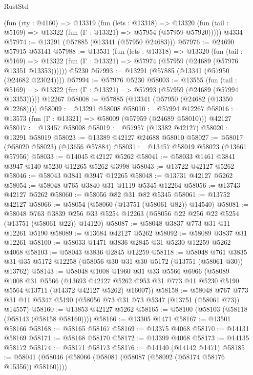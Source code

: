 \begin{lexlean}{RustStd}
\begin{coremodule}
    (fun (rty : @4160) =>
    @13319
      (fun (lets : @13318) =>
      @13320 (fun (tail : @5169) => @13322 (fun (Γ : @13321) => @57954 (@57959 @57920)))))
    @4334
@57974 := @13291 (@57885 (@13341 (@57950 @24683)))
@57976 := @24690 @57915 @53141
@57988 := @13531
    (fun (lets : @13318) =>
    @13320
      (fun (tail : @5169) =>
      @13322 (fun (Γ : @13321) => @57974 (@57959 (@24689 (@57976 @13351 @13353))))))
    @5230
@57993 := @13291 (@57885 (@13341 (@57950 (@24682 @23024))))
@57994 := @57976 @5230
@58003 := @13555
    (fun (tail : @5169) => @13322 (fun (Γ : @13321) => @57993 (@57959 (@24689 (@57994 @13353)))))
    @12267
@58008 := @57885 (@13341 (@57950 (@24682 (@13350 @12268))))
@58009 := @13291 @58008
@58010 := @57994 @12267
@58016 := @13573 (fun (Γ : @13321) => @58009 (@57959 (@24689 @58010))) @42127
@58017 := @13457 @58008
@58019 := @57957 (@13382 @42127)
@58020 := @13291 @58019
@58023 := @13389 @42127 @24688 @58010
@58027 := @58017 (@58020 @58023) (@13656 @57884)
@58031 := @13457 @58019 @58023 (@13661 @57956)
@58033 := @14045 @42127 @5262
@58041 := @58033 @1461 @3841 @3947 @140 @5230 @12265 @5262 @3998
@58043 := @13722 @42127 @5262
@58046 := @58043 @3841 @3947 @12265
@58048 := @13731 @42127 @5262
@58054 := @58048 @765 @3840 @31 @1119 @5345 @12264
@58056 := @13743 @42127 @5262
@58060 := @58056 @82 @31 @82 @5345
@58061 := @13752 @42127
@58066 := @58054 (@58060 (@13751 (@58061 @82)) @14540)
@58081 := @58048
    @763
    @3839
    @256
    @33
    @5254
    @12263
    (@58056 @22 @256 @22 @5254 (@13751 (@58061 @22)) @14120)
@58087 := @58048 @3837 @773 @31 @11 @12261 @5190
@58089 := @13684 @42127 @5262
@58092 := @58089 @3837 @31 @12261
@58100 := @58033 @1471 @3836 @2845 @31 @5230 @12259 @5262 @4068
@58103 := @58043 @3836 @2845 @12259
@58118 := @58048
    @761
    @3835
    @31
    @35
    @5172
    @12258
    (@58056 @30 @31 @30 @5172 (@13751 (@58061 @30)) @13762)
@58143 := @58048
    @1008
    @1960
    @31
    @33
    @5566
    @6966
    (@58089
      @1008
      @31
      @5566
      (@13693 @42127 @5262 @953 @31 @773 @11 @5230 @5190 @5564 @13711 (@14372 @42127 @5262) @16007))
@58158 := @58048
    @767
    @773
    @31
    @11
    @5347
    @5190
    (@58056 @73 @31 @73 @5347 (@13751 (@58061 @73)) @14557)
@58160 := @13853 @42127 @5262
@58165 := @58100 (@58103 (@58118 (@58143 (@58158 @58160))))
@58166 := @13305 @1471
@58167 := @13501 @58166
@58168 := @58165 @58167
@58169 := @13375 @4068
@58170 := @14131 @58169
@58171 := @58168 @58170
@58172 := @13399 @4068
@58173 := @14135 @58172
@58174 := @58171 @58173
@58176 := @14140 (@14142 @1471)
@58185 := @58041 (@58046 (@58066 (@58081 (@58087 (@58092 (@58174 @58176 @15356)) @58160))))

\end{coremodule}
\end{lexlean}
